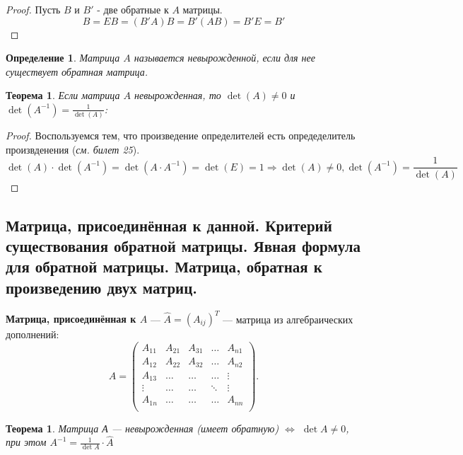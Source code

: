 \documentclass[a4paper, 12pt]{article}
\newtheorem*{theorem}{Теорема}
\newtheorem*{definition}{Определение}
\newtheorem*{que30theorem}{Теорема}
\begin{document}
\begin{proof}
Пусть $B$ и $B'$ - две обратные к $A$ матрицы.
\[B = EB = (B'A)B = B'(AB) = B'E = B'\]
\end{proof}

\begin{definition}
Матрица $A$ называется невырожденной, если для нее существует обратная матрица.
\end{definition}

\begin{theorem}
Если матрица $A$ невырожденная, то $\det(A) \neq 0$ и $\det(A^{-1})= \frac{1}{\det(A)}$:
\end{theorem}

\begin{proof} Воспользуемся тем, что произведение определителей есть опредеделитель произвденения (\textit{см. билет 25}).
\[\det(A) \cdot \det(A^{-1}) = \det(A\cdot A^{-1}) = \det(E) = 1 \Rightarrow \det(A) \neq 0, \det(A^{-1})= \frac{1}{\det(A)}\]
\end{proof}

\subsection{Матрица, присоединённая к данной. Критерий существования обратной матрицы. Явная формула для обратной матрицы. Матрица, обратная к произведению двух матриц.}
\textbf{Матрица, присоединённая к $A$} — $\hat{A} = (A_{ij})^T$ — матрица из алгебраических дополнений: 
\[\hat A = \begin{pmatrix}
A_{11} & A_{21} & A_{31} & \ldots & A_{n1} \\
A_{12} & A_{22} & A_{32} & \ldots & A_{n2} \\
A_{13} & \ldots & \ldots & \ldots & \vdots \\
\vdots & \ldots & \ldots & \ddots & \vdots \\
A_{1n} & \ldots & \ldots & \ldots & A_{nn} \\
\end{pmatrix}.\]

\begin{que30theorem}
Матрица А --- \textit{невырожденная} (имеет обратную) $\iff$ $\det A \neq 0$, при этом $A^{-1} = \frac{1}{\det A} \cdot \hat{A}$
\end{que30theorem}
\end{document}

